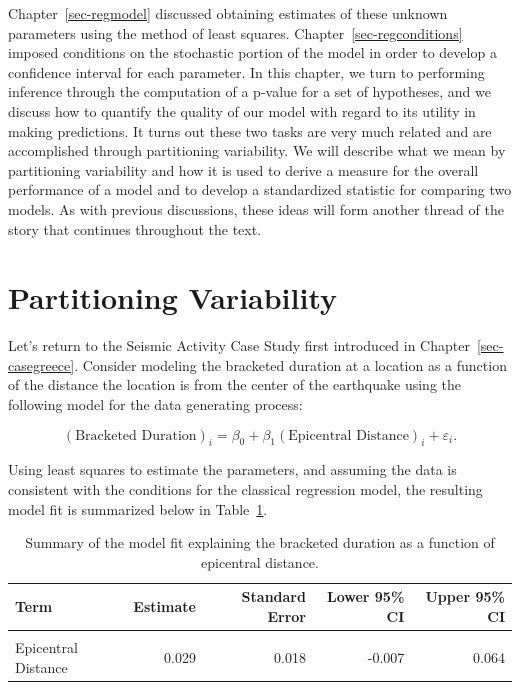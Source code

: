 \documentclass[
  letterpaper,
  DIV=11,
  numbers=noendperiod]{scrreprt}
\theoremstyle{definition}
\theoremstyle{definition}
\theoremstyle{plain}
\theoremstyle{remark}
\begin{document}
Chapter~\ref{sec-regmodel} discussed obtaining estimates of these
unknown parameters using the method of least squares.
Chapter~\ref{sec-regconditions} imposed conditions on the stochastic
portion of the model in order to develop a confidence interval for each
parameter. In this chapter, we turn to performing inference through the
computation of a p-value for a set of hypotheses, and we discuss how to
quantify the quality of our model with regard to its utility in making
predictions. It turns out these two tasks are very much related and are
accomplished through partitioning variability. We will describe what we
mean by partitioning variability and how it is used to derive a measure
for the overall performance of a model and to develop a standardized
statistic for comparing two models. As with previous discussions, these
ideas will form another thread of the story that continues throughout
the text.

\hypertarget{partitioning-variability}{%
\section{Partitioning Variability}\label{partitioning-variability}}

Let's return to the Seismic Activity Case Study first introduced in
Chapter~\ref{sec-casegreece}. Consider modeling the bracketed duration
at a location as a function of the distance the location is from the
center of the earthquake using the following model for the data
generating process:

\[(\text{Bracketed Duration})_i = \beta_0 + \beta_1(\text{Epicentral Distance})_i + \varepsilon_i.\]

Using least squares to estimate the parameters, and assuming the data is
consistent with the conditions for the classical regression model, the
resulting model fit is summarized below in
Table~\ref{tbl-regquality-fit}.

\hypertarget{tbl-regquality-fit}{}
\begin{table}
\caption{\label{tbl-regquality-fit}Summary of the model fit explaining the bracketed duration as a function
of epicentral distance. }\tabularnewline

\centering
\begin{tabular}[t]{lrrrr}
\toprule
Term & Estimate & Standard Error & Lower 95\% CI & Upper 95\% CI\\
\midrule
\cellcolor{gray!6}{(Intercept)} & \cellcolor{gray!6}{4.462} & \cellcolor{gray!6}{0.726} & \cellcolor{gray!6}{3.024} & \cellcolor{gray!6}{5.899}\\
Epicentral Distance & 0.029 & 0.018 & -0.007 & 0.064\\
\bottomrule
\end{tabular}
\end{table}
\end{document}
